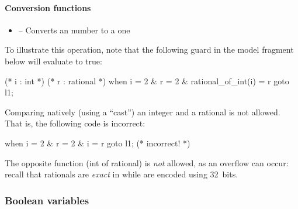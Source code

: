 \paragraph{Conversion functions}

\begin{itemize}
    \item \label{item:lbl-rational_of_int}  -- Converts an  number to a  one
\end{itemize}

\begin{example}
	To illustrate this operation, note that the following guard in the model fragment below will evaluate to true:

	\begin{IMITATORmodel}
		(* i : int *)
		(* r : rational *)
		when i = 2 & r = 2 & rational_of_int(i) = r goto l1;
	\end{IMITATORmodel}
\end{example}

\begin{remark}
	Comparing natively (using a ``cast'') an integer and a rational is not allowed.
	That is, the following code is incorrect:

		\begin{IMITATORmodel}
			when i = 2 & r = 2 & i = r goto l1; (* incorrect! *)
		\end{IMITATORmodel}
\end{remark}

The opposite function (int of rational) is \emph{not} allowed, as an overflow can occur: recall that rationals are \emph{exact} in \imitator{} while  are encoded using 32~bits.


\subsubsection{Boolean variables}

